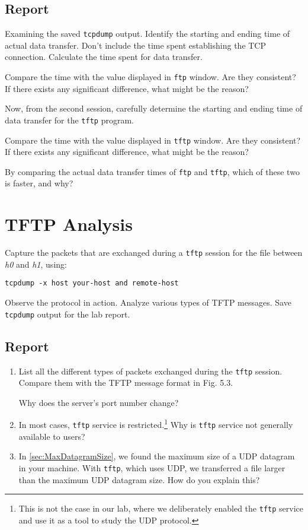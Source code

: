 \documentclass{../UTNetLab}
\begin{document}
	\subsection*{Report}
	Examining the saved \lstinline{tcpdump} output. Identify the starting and ending time of actual data transfer.
	Don’t include the time spent establishing the TCP connection.
	Calculate the time spent for data transfer. 

	Compare the time with the value displayed in \lstinline{ftp} window.
	Are they consistent?
	If there exists any significant difference, what might be the reason? 

	Now, from the second session, carefully determine the starting and ending time of data transfer for the \lstinline{tftp} program. 

	Compare the time with the value displayed in \lstinline{tftp} window.
	Are they consistent?
	If there exists any significant difference, what might be the reason? 

	By comparing the actual data transfer times of \lstinline{ftp} and \lstinline{tftp}, which of these two is faster, and why?

\section{TFTP Analysis}
	Capture the packets that are exchanged during a \lstinline{tftp} session for the  file between \textit{h0} and \textit{h1}, using:
	\begin{lstlisting}[emph={your-host, remote-host}]
tcpdump -x host your-host and remote-host
	\end{lstlisting}
	Observe the protocol in action.	Analyze various types of TFTP messages. Save \lstinline{tcpdump} output for the lab report.
	
    \subsection*{Report}
	\begin{enumerate}
		\item List all the different types of packets exchanged during the \lstinline{tftp} session. Compare them with the TFTP message format in Fig. 5.3.

        Why does the server’s port number change?
		
        \item In most cases, \lstinline{tftp} service is restricted.\footnote{This is not the case in our lab, where we deliberately enabled the \lstinline{tftp} service and use it as a tool to study the UDP protocol.}
		Why is \lstinline{tftp} service not generally available to users?
		
        \item In \autoref{sec:MaxDatagramSize}, we found the maximum size of a UDP datagram in your machine. With \lstinline{tftp}, which uses UDP, we transferred a file larger than the maximum UDP datagram size.
		How do you explain this?
	\end{enumerate}
\end{document}
